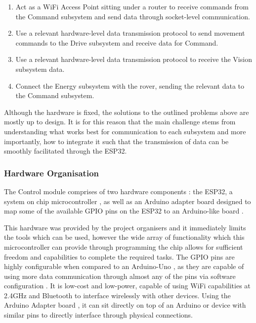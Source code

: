 \documentclass[a4paper]{article}
\begin{document}
\begin{enumerate}
    \item Act as a WiFi Access Point sitting under a router to receive
    commands from the Command subsystem and send data through 
    socket-level communication.
    \item Use a relevant hardware-level data transmission protocol to
    send movement commands to the Drive subsystem and receive data for 
    Command. 
    \item Use a relevant hardware-level data transmission protocol to 
    receive the Vision subsystem data.
    \item Connect the Energy subsystem with the rover, sending the 
    relevant data to the Command subsystem.
\end{enumerate}

Although the hardware is fixed, the solutions to the outlined problems
above are mostly up to design. It is for this reason that the main 
challenge stems from understanding what works best for communication 
to each subsystem and more importantly, how to integrate it such that 
the transmission of data can be smoothly facilitated through the ESP32.

\subsubsection{Hardware Organisation}

The Control module comprises of two hardware components \cite{BoxContent}: 
the ESP32, a system on chip microcontroller \cite{ESP32Datasheet}, as 
well as an Arduino adapter board designed to map some of the available 
GPIO pins on the ESP32 to an Arduino-like board \cite{ESP32ArduinoAdapter}.

This hardware was provided by the project organisers and it immediately 
limits the tools which can be used, however the wide array of functionality 
which this microcontroller can provide through programming the chip allows
for sufficient freedom and capabilities to complete the required tasks. The
GPIO pins are highly configurable when compared to an Arduino-Uno 
\cite{MicrocontrollerComparison}, as they are capable of using more data 
communication through almost any of the pins via software configuration 
\cite{ESP32PinOut}. It is low-cost and low-power, capable of using 
WiFi capabilities at 2.4GHz and Bluetooth \cite{ESP32Datasheet} to 
interface wirelessly with other devices. Using the Arduino Adapter 
board \cite{ESP32ArduinoAdapter}, it can sit directly on top of an 
Arduino or device with similar pins to directly interface through 
physical connections. 
\end{document}

